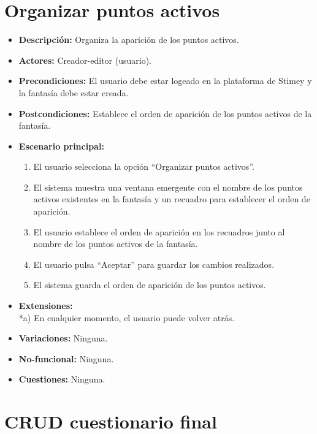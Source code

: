 \documentclass[12pt,letterpaper]{article}
\begin{document}
\section{Organizar puntos activos}
\begin{itemize}
	\item \textbf{Descripción:} Organiza la aparición de los puntos activos.
	\item \textbf{Actores:} Creador-editor (usuario).
	\item \textbf{Precondiciones:} El usuario debe estar logeado en la plataforma de Stimey y la fantasía debe estar creada.
	\item \textbf{Postcondiciones:} Establece el orden de aparición de los puntos activos de la fantasía.
	\item \textbf{Escenario principal:}
	\begin{enumerate}
		\item El usuario selecciona la opción ``Organizar puntos activos''.
		\item El sistema muestra una ventana emergente con el nombre de los puntos activos existentes en la fantasía y un recuadro para establecer el orden de aparición.
		\item El usuario establece el orden de aparición en los recuadros junto al nombre de los puntos activos de la fantasía.
		\item El usuario pulsa ``Aceptar'' para guardar los cambios realizados.
		\item El sistema guarda el orden de aparición de los puntos activos.
	\end{enumerate}
	\item \textbf{Extensiones:} \\ *a) En cualquier momento, el usuario puede volver atrás.
	\item \textbf{Variaciones:} Ninguna.
	\item \textbf{No-funcional:} Ninguna.
	\item \textbf{Cuestiones:} Ninguna.
\end{itemize}

\section{CRUD cuestionario final}
\hypertarget{crearquizfinal}{}
\end{document}
